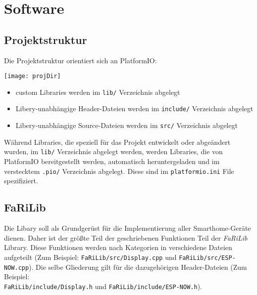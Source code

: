 \chapter{Software}

    \section{Projektstruktur}
    Die Projektstruktur orientiert sich an PlatformIO:
    
    \vspace{0.5cm}
    \begin{minipage}{0.48\linewidth}
            \centering
            \texttt{[image: projDir]}
            \label{fig:projDir}
    \end{minipage}
    \hfill
    \begin{minipage}{0.48\linewidth}
        \raggedright
        \begin{itemize}
            \item custom Libraries werden im \lstinline{lib/} 
            Verzeichnis abgelegt
            \item Libery-unabhängige Header-Dateien 
            werden im \lstinline{include/} Verzeichnis abgelegt
            \item Libery-unabhängige Source-Dateien 
            werden im \lstinline{src/} Verzeichnis abgelegt
        \end{itemize}
    \end{minipage}
    \vspace{0.5cm}

    Während Libraries, die speziell für das Projekt entwickelt oder abgeändert wurden,
    im \lstinline{lib/} Verzeichnis abgelegt werden, werden Libraries,
    die von PlatformIO bereitgestellt werden, automatisch heruntergeladen
    und im verstecktem \lstinline{.pio/} Verzeichnis abgelegt. Diese sind im
    \lstinline{platformio.ini} File spezifiziert.

    \section{FaRiLib}
    Die Libary soll als Grundgerüst für die Implementierung aller Smarthome-Geräte
    dienen. Daher ist der größte Teil der geschriebenen Funktionen Teil der 
    \textit{FaRiLib} Library. Diese Funktionen werden nach Kategorien in verschiedene
    Dateien aufgeteilt (Zum Beispiel: \lstinline{FaRiLib/src/Display.cpp} und 
    \lstinline{FaRiLib/src/ESP-NOW.cpp}). Die selbe Gliederung gilt für die 
    dazugehörigen Header-Dateien (Zum Beispiel: \\ \lstinline{FaRiLib/include/Display.h} und 
    \lstinline{FaRiLib/include/ESP-NOW.h}).


